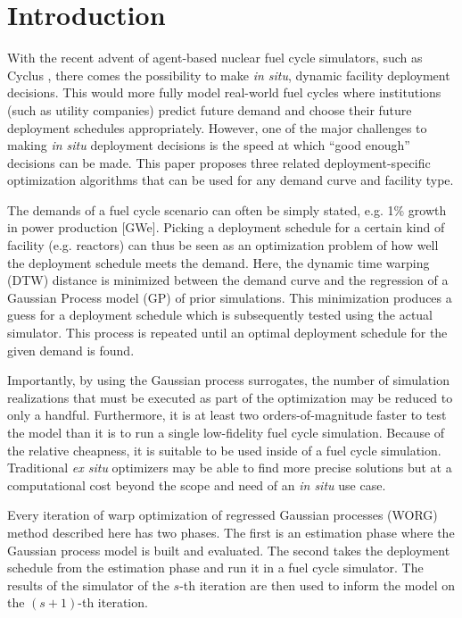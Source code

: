 \section{Introduction}
\label{intro}

With the recent advent of agent-based nuclear fuel cycle simulators, such as 
Cyclus \cite{DBLP:journals/corr/HuffGCFMOSSW15,cyclus_v1_0}, there comes the 
possibility to make \emph{in situ}, dynamic facility deployment decisions.
This  would more fully model real-world fuel cycles where institutions 
(such as utility companies)
predict future demand and choose their future deployment schedules 
appropriately. However, one of the major challenges to making \emph{in situ}
deployment decisions is the speed at which ``good enough'' decisions can 
be made. This paper proposes three related deployment-specific optimization 
algorithms that can be used for any demand curve and facility type.

The demands of a fuel cycle scenario can often be simply stated, e.g. 
1\% growth in power production [GWe]. Picking a deployment schedule for a 
certain kind of facility (e.g. reactors) can thus be seen as an optimization 
problem of how well the deployment schedule meets the demand. Here, the 
dynamic time warping (DTW) \cite{muller} distance is minimized 
between the demand curve and the regression of a Gaussian Process model (GP) 
\cite{rasmussen2006gaussian} of prior simulations. This minimization produces
a guess for a deployment schedule which is subsequently tested using 
the actual simulator. This process is repeated until an optimal deployment
schedule for the given demand is found.

Importantly, by using the Gaussian process surrogates, the number of 
simulation realizations that must be executed as part of the optimization may 
be reduced to only a handful. Furthermore, it is at least two 
orders-of-magnitude faster to test the model than it is to run a single
low-fidelity fuel cycle simulation. Because of the relative cheapness, it 
is suitable to be used inside of a fuel cycle simulation. Traditional
\emph{ex situ} optimizers may be able to find more precise solutions but at a
computational cost beyond the scope and need of an \emph{in situ} use case.

Every iteration of warp optimization of regressed Gaussian processes (WORG) 
method described here has two phases. The first is an estimation phase where 
the Gaussian process model is built and evaluated. The second takes the 
deployment schedule from the estimation phase and run it in a fuel cycle 
simulator. The results of the simulator of the $s$-th iteration are then 
used to inform the model on the $(s+1)$-th iteration. 

